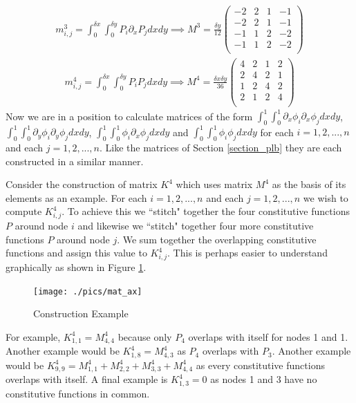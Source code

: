 \documentclass[11pt,fleqn]{article}
\theoremstyle{defstyle}
\begin{document}
\begin{equation}
\begin{aligned}
m^3_{i,j} = \int_0^{\delta x} \int_0^{\delta y} P_i \partial_x P_j dxdy \implies
M^3 = \frac{\delta y}{12}\begin{pmatrix}
-2 & 2 & 1 & -1 \\
-2 & 2 & 1 & -1 \\
-1 & 1 & 2 & -2 \\
-1 & 1 & 2 & -2 \\
\end{pmatrix}
\end{aligned}
\label{eq_pdnx}
\end{equation}
\begin{equation}
\begin{aligned}
m^4_{i,j} = \int_0^{\delta x} \int_0^{\delta y} P_iP_j dxdy \implies
M^4 = \frac{\delta x \delta y}{36}\begin{pmatrix}
4 & 2 & 1 & 2 \\
2 & 4 & 2 & 1 \\
1 & 2 & 4 & 2 \\
2 & 1 & 2 & 4 \\
\end{pmatrix}
\end{aligned}
\label{eq_pnn}
\end{equation}
Now we are in a position to calculate matrices of the form $\int_0^1 \int_0^1 \partial_x\phi_i \partial_x\phi_j dxdy$, $\int_0^1 \int_0^1 \partial_y\phi_i \partial_y\phi_j dxdy$, $\int_0^1 \int_0^1 \phi_i \partial_x\phi_j dxdy$ and $\int_0^1 \int_0^1 \phi_i \phi_j dxdy$ for each $i=1,2,...,n$ and each $j=1,2,...,n$. Like the matrices of Section \ref{section_plb} they are each constructed in a similar manner.

Consider the construction of matrix $K^4$ which uses matrix $M^4$ as the basis of its elements as an example. For each $i=1,2,...,n$ and each $j=1,2,...,n$ we wish to compute $K^4_{i,j}$. To achieve this we ``stitch" together the four constitutive functions $P$ around node $i$ and likewise we ``stitch" together four more constitutive functions $P$ around node $j$. We sum together the overlapping constitutive functions and assign this value to $K^4_{i,j}$. This is perhaps easier to understand graphically as shown in Figure \ref{fig_mat_ex}.
\begin{figure}[H] 
\centering
\texttt{[image: ./pics/mat\_ax]}
\caption{Construction Example} 
\label{fig_mat_ex}
\end{figure} 
For example, $K^4_{1,1} = M^4_{4,4}$ because only $P_4$ overlaps with itself for nodes 1 and 1. Another example would be $K^4_{1,8} = M^4_{4,3}$ as $P_4$ overlaps with $P_3$. Another example would be $K^4_{9,9} = M^4_{1,1} + M^4_{2,2}+ M^4_{3,3}+M^4_{4,4}$ as every constitutive functions overlaps with itself. A final example is $K^4_{1,3} = 0$ as nodes 1 and 3 have no constitutive functions in common. 
\end{document}
